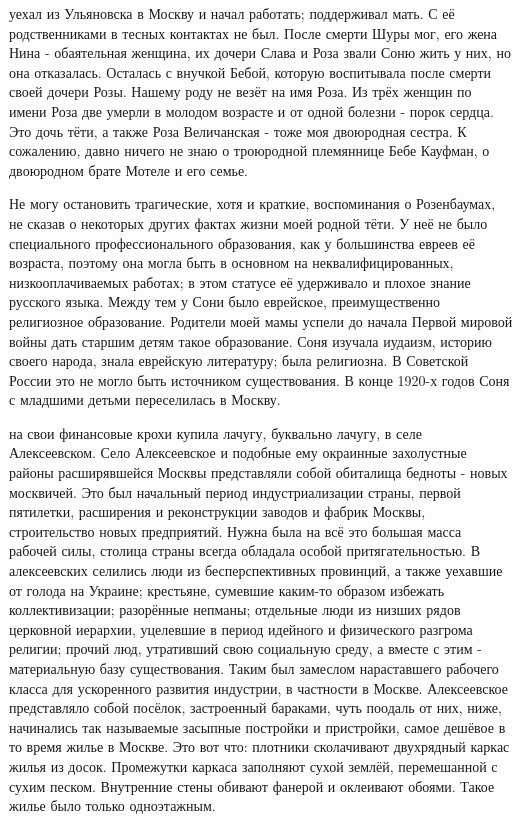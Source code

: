 уехал из Ульяновска в Москву и начал работать; поддерживал мать. С её родственниками в тесных контактах не был. После смерти Шуры мог, его жена Нина - обаятельная женщина, их дочери Слава и Роза звали Соню жить у них, но она отказалась. Осталась с внучкой Бебой, которую воспитывала после смерти своей дочери Розы. Нашему роду не везёт на имя Роза. Из трёх женщин по имени Роза две умерли в молодом возрасте и от одной болезни - порок сердца. Это дочь тёти, а также Роза Величанская - тоже моя двоюродная сестра. К сожалению, давно ничего не знаю о троюродной племяннице Бебе Кауфман, о двоюродном брате Мотеле и его семье.

Не могу остановить трагические, хотя и краткие, воспоминания о Розенбаумах, не сказав о некоторых других фактах жизни моей родной тёти. У неё не было специального профессионального образования, как у большинства евреев её возраста, поэтому она могла быть в основном на неквалифицированных, низкооплачиваемых работах; в этом статусе её удерживало и плохое знание русского языка. Между тем у Сони было еврейское, преимущественно религиозное образование. Родители моей мамы успели до начала Первой мировой войны дать старшим детям такое образование. Соня изучала иудаизм, историю своего народа, знала еврейскую литературу; была религиозна. В Советской России это не могло быть источником существования. В конце 1920-х годов Соня с младшими детьми переселилась в Москву.

на свои финансовые крохи купила лачугу, буквально лачугу, в селе Алексеевском. Село Алексеевское и подобные ему окраинные захолустные районы расширявшейся Москвы представляли собой обиталища бедноты - новых москвичей. Это был начальный период индустриализации страны, первой пятилетки, расширения и реконструкции заводов и фабрик Москвы, строительство новых предприятий. Нужна была на всё это большая масса рабочей силы, столица страны всегда обладала особой притягательностью. В алексеевских селились люди из бесперспективных провинций, а также уехавшие от голода на Украине; крестьяне, сумевшие каким-то образом избежать коллективизации; разорённые непманы; отдельные люди из низших рядов церковной иерархии, уцелевшие в период идейного и физического разгрома религии; прочий люд, утративший свою социальную среду, а вместе с этим - материальную базу существования. Таким был замеслом нараставшего рабочего класса для ускоренного развития индустрии, в частности в Москве. Алексеевское представляло собой посёлок, застроенный бараками, чуть поодаль от них, ниже, начинались так называемые засыпные постройки и пристройки, самое дешёвое в то время жилье в Москве. Это вот что: плотники сколачивают двухрядный каркас жилья из досок. Промежутки каркаса заполняют сухой землёй, перемешанной с сухим песком. Внутренние стены обивают фанерой и оклеивают обоями. Такое жилье было только одноэтажным.


